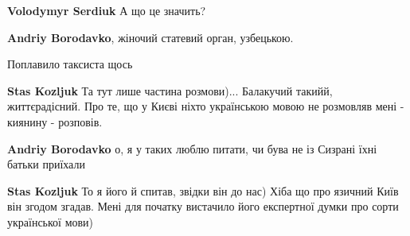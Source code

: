 \begin{itemize}
\begin{itemize}
\textbf{Volodymyr Serdiuk}
А що це значить?

 
\textbf{Andriy Borodavko}, жіночий статевий орган, узбецькою.
\end{itemize}

 
Поплавило таксиста щось

\begin{itemize}
 
\textbf{Stas Kozljuk}
Та тут лише частина розмови)...
Балакучий такийй, життєрадісний.
Про те, що у Києві ніхто українською мовою не розмовляв мені - киянину - розповів.

 
\textbf{Andriy Borodavko} о, я у таких люблю питати, чи бува не із Сизрані їхні батьки приїхали

 
\textbf{Stas Kozljuk}
То я його й спитав, звідки він до нас)
Хіба що про язичний Київ він згодом згадав.
Мені для початку вистачило його експертної думки про сорти української мови)
\end{itemize}

 

\end{itemize}
